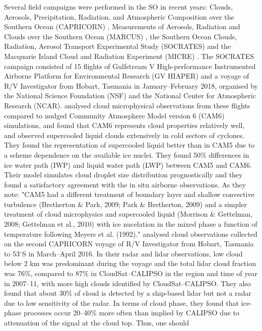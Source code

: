Several field campaigns were performed in the SO in recent years:
Clouds, Aerosols, Precipitation, Radiation, and Atmospheric Composition over the Southern Ocean (CAPRICORN) \citep{mace2018a,mace2018b}, Measurements of Aerosols, Radiation and Clouds over the Southern Ocean (MARCUS) \citep{mcfarquhar2016},
the Southern Ocean Clouds, Radiation, Aerosol Transport Experimental Study (SOCRATES) \citep{mcfarquhar2014} and the Macquarie Island Cloud and Radiation Experiment (MICRE) \citep{demott2018}.
The SOCRATES campaign consisted of 15 flights of Gulfstream V
High-performance Instrumented Airborne Platform for Environmental Research
(GV HIAPER) and a voyage
of R/V Investigator from Hobart, Tasmania in January--February 2018,
organised by the National Science Foundation (NSF) and the
National Center for Atmospheric Research (NCAR). \cite{gettelman2020}
analysed cloud microphysical observations from these flights compared
to nudged Community Atmosphere Model version 6 (CAM6) simulations, and found that CAM6 represents cloud properties
relatively well, and observed supercooled liquid clouds extensively in cold
sectors of cyclones. They found the representation of supercooled liquid
better than in CAM5
due to a scheme dependence on the available ice nuclei.
They found 50\% differences in ice water path (IWP) and liquid water path (LWP)
between CAM5 and CAM6. Their model simulates cloud droplet size distribution
prognostically and they found a satisfactory agreement with the in situ
airborne observations. As they note: "CAM5 had a different treatment of boundary
layer and shallow convective turbulence (Bretherton \& Park, 2009;
Park \& Bretherton, 2009) and a simpler treatment of cloud microphysics and supercooled
liquid (Morrison \& Gettelman, 2008; Gettelman et al., 2010) with ice nucelation in the
mixed phase a function of temperature following Meyers et al. (1992)."
\cite{mace2018a} analysed cloud observations collected on the second CAPRICORN
voyage of R/V Investigator from Hobart, Tasmania to 53$^\circ$S in March--April 2016.
In their radar and lidar observations, low cloud below 2 km was predominant
during the voyage and the total lidar cloud fraction was 76\%, compared to 87\%
in CloudSat--CALIPSO in the region and time of year in 2007--11, with
more high clouds identified by CloudSat--CALIPSO.
They also found that about 30\% of cloud is detected by a ship-based lidar but not
a radar due to low sensitivity of the radar. In terms of cloud phase,
they found that ice-phase processes occur 20--40\% more often than implied
by CALIPSO due to attenuation of the signal at the cloud top. Thus, one should
